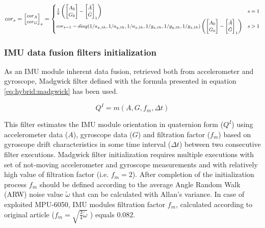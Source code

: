 \documentclass[sensors,article,submit,moreauthors,pdftex,10pt,a4paper]{mdpi}
\begin{document}
\begin{equation}
	\footnotesize
	cor_s = \begin{bmatrix}cor_A\\ cor_G\end{bmatrix}_s =
	\begin{cases}
		\frac{1}{8}\left(\begin{bmatrix}A_0                                                                          \\ G_0\end{bmatrix} - \begin{bmatrix}\bar{A}\\ \bar{G}\end{bmatrix}_1\right) & s = 1\\
		cor_{s-1} - diag(1/a_{x,th},1/a_{y,th},1/a_{z,th},1/g_{x,th},1/g_{y,th},1/g_{z,th}) \left(\begin{bmatrix}A_0 \\ G_0\end{bmatrix} - \begin{bmatrix}\bar{A}\\ \bar{G}\end{bmatrix}_1\right) & s > 1
	\end{cases}
	\label{eq:hybrid:IMUCalibration:2}
\end{equation}


\subsubsection{IMU data fusion filters initialization}
As an IMU module inherent data fusion, retrieved both from accelerometer and gyroscope, Madgwick filter \cite{Madgwick2011} defined with the formula presented in equation \ref{eq:hybrid:madgwick} has been used. 

\begin{equation}
Q^I=m(A,G,f_m,\Delta t)
\label{eq:hybrid:madgwick}
\end{equation}

This filter estimates the IMU module orientation in quaternion form ($Q^I$) using accelerometer data ($A$), gyroscope data ($G$) and filtration factor ($f_m$) based on gyroscope drift characteristics in some time interval ($\Delta t$) between two consecutive filter executions. Madgwick filter initialization requires multiple executions with set of not-moving accelerometer and gyroscope measurements and with relatively high value of filtration factor (i.e. $f_m=2$). After completion of the initialization process $f_m$  should be defined according to the average Angle Random Walk (ARW) noise value $\widetilde{\omega}$ that can be calculated with Allan’s variance\cite{FreescaleSemiconductor2015,Allan1966,Allan1987}. In case of exploited MPU-6050, IMU modules filtration factor $f_m$, calculated according to original article ($f_m = \sqrt{\frac{3}{4}\widetilde{\omega}}$\cite{Madgwick2011} ) equals $0.082$. 
\end{document}
